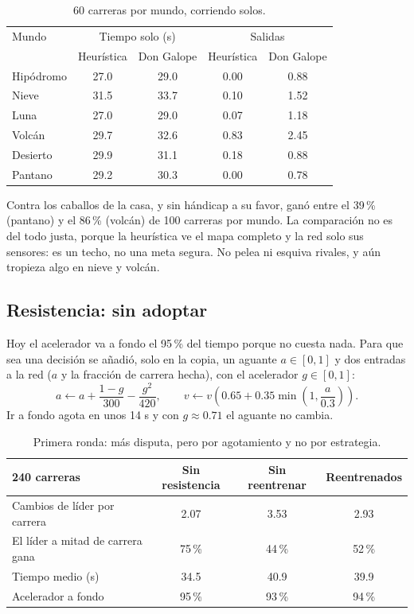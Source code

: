 \documentclass[11pt,letterpaper]{article}
\begin{document}
\begin{table}[h]\centering
\begin{tabular}{lcccc}
\toprule
Mundo & \multicolumn{2}{c}{Tiempo solo (s)} & \multicolumn{2}{c}{Salidas} \\
 & Heurística & Don Galope & Heurística & Don Galope \\
\midrule
Hipódromo & 27.0 & 29.0 & 0.00 & 0.88 \\
Nieve & 31.5 & 33.7 & 0.10 & 1.52 \\
Luna & 27.0 & 29.0 & 0.07 & 1.18 \\
Volcán & 29.7 & 32.6 & 0.83 & 2.45 \\
Desierto & 29.9 & 31.1 & 0.18 & 0.88 \\
Pantano & 29.2 & 30.3 & 0.00 & 0.78 \\
\bottomrule
\end{tabular}
\caption{60 carreras por mundo, corriendo solos.}
\end{table}

Contra los caballos de la casa, y sin hándicap a su favor, ganó entre el 39\,\% (pantano) y el 86\,\% (volcán) de 100 carreras por mundo. La comparación no es del todo justa, porque la heurística ve el mapa completo y la red solo sus sensores: es un techo, no una meta segura. No pelea ni esquiva rivales, y aún tropieza algo en nieve y volcán.

\subsection{Resistencia: sin adoptar}
Hoy el acelerador va a fondo el 95\,\% del tiempo porque no cuesta nada. Para que sea una decisión se añadió, solo en la copia, un aguante $a \in [0,1]$ y dos entradas a la red ($a$ y la fracción de carrera hecha), con el acelerador $g \in [0,1]$:
\begin{equation}
a \leftarrow a + \frac{1-g}{300} - \frac{g^2}{420}, \qquad v \leftarrow v \left(0.65 + 0.35 \min\!\left(1, \frac{a}{0.3}\right)\right).
\end{equation}
Ir a fondo agota en unos 14 s y con $g \approx 0.71$ el aguante no cambia.

\begin{table}[h]\centering
\begin{tabular}{lccc}
\toprule
240 carreras & Sin resistencia & Sin reentrenar & Reentrenados \\
\midrule
Cambios de líder por carrera & 2.07 & 3.53 & 2.93 \\
El líder a mitad de carrera gana & 75\,\% & 44\,\% & 52\,\% \\
Tiempo medio (s) & 34.5 & 40.9 & 39.9 \\
Acelerador a fondo & 95\,\% & 93\,\% & 94\,\% \\
\bottomrule
\end{tabular}
\caption{Primera ronda: más disputa, pero por agotamiento y no por estrategia.}
\end{table}
\end{document}
